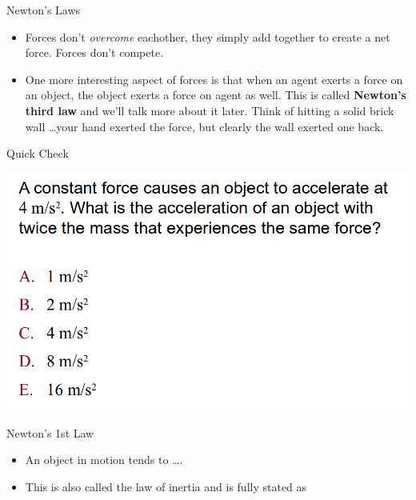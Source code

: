 \documentclass{beamer}
\newcommand{\red}[1]{{\color{red}{#1}}}
\newcommand{\checkL}[2]{\begin{textblock*}{1cm}(#1,#2){\Large \red{\Checkmark}}\end{textblock*}}
\begin{document}
\begin{frame}{Newton's Laws}
\begin{itemize}
   \item Forces don't {\it overcome} eachother, they simply add together to create a net force. Forces don't compete.
   \item One more interesting aspect of forces is that when an agent exerts a force on an object, the object exerts a force on agent as well. This is called {\bf Newton's third law} and we'll talk more about it later. Think of hitting a solid brick wall \ldots your hand exerted the force, but clearly the wall exerted one back.
\end{itemize}
\end{frame}

\begin{frame}{Quick Check}
\begin{center}
   \includegraphics[width=\textwidth]{../figures/QC5_7.png}
\end{center}
\only<2>{\checkL{0.9cm}{4.8cm}}
\end{frame}

\begin{frame}{Newton's 1st Law}
\begin{itemize}
   \item An object in motion tends to \ldots {}.
   \item<3-> This is also called the law of inertia and is fully stated as 
\end{itemize}
\end{frame}
\end{document}
